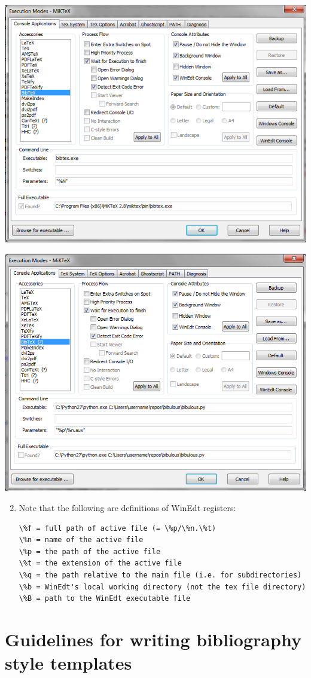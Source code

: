 \documentclass[letterpaper,10pt,english]{sphinxmanual}
\begin{document}
\includegraphics[width=0.490\linewidth]{original_Winedt5_setup.png}

\includegraphics[width=0.490\linewidth]{modified_Winedt5_setup.png}
\begin{enumerate}
\setcounter{enumi}{1}
\item {} 
Note that the following are definitions of WinEdt registers:

\begin{Verbatim}[commandchars=\\\{\}]
\%f = full path of active file (= \%p/\%n.\%t)
\%n = name of the active file
\%p = the path of the active file
\%t = the extension of the active file
\%q = the path relative to the main file (i.e. for subdirectories)
\%b = WinEdt's local working directory (not the tex file directory)
\%B = path to the WinEdt executable file
\end{Verbatim}

\end{enumerate}


\chapter{Guidelines for writing bibliography style templates}
\label{guidelines_for_writing_style_templates:guidelines-for-writing-bibliography-style-templates}\label{guidelines_for_writing_style_templates::doc}
\end{document}
